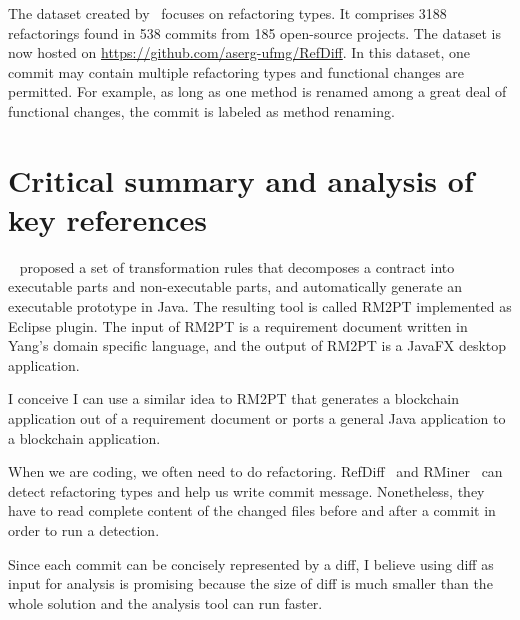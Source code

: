 The dataset created by~\cite{tsantalis2018accurate} focuses on refactoring types. It comprises \num{3188} refactorings found in 538 commits from 185 open-source projects. The dataset is now hosted on \url{https://github.com/aserg-ufmg/RefDiff}. In this dataset, one commit may contain multiple refactoring types and functional changes are permitted. For example, as long as one method is renamed among a great deal of functional changes, the commit is labeled as method renaming.




\section{Critical summary and analysis of key references}

~\cite{yang2019automated} proposed a set of transformation rules that decomposes a contract into executable parts and non-executable parts, and automatically generate an executable prototype in Java.
The resulting tool is called RM2PT implemented as Eclipse plugin. The input of RM2PT is a requirement document written in Yang's domain specific language, and the output of RM2PT is a JavaFX desktop application.

I conceive I can use a similar idea to RM2PT that generates a blockchain application out of a requirement document or ports a general Java application to a blockchain application.


When we are coding, we often need to do refactoring.
RefDiff~\cite{silva2020refdiff} and RMiner~\cite{tsantalis2018accurate} can detect refactoring types and help us write commit message. Nonetheless, they have to read complete content of the changed files before and after a commit in order to run a detection.

Since each commit can be concisely represented by a diff, I believe using diff as input for analysis is promising because the size of diff is much smaller than the whole solution and the analysis tool can run faster.